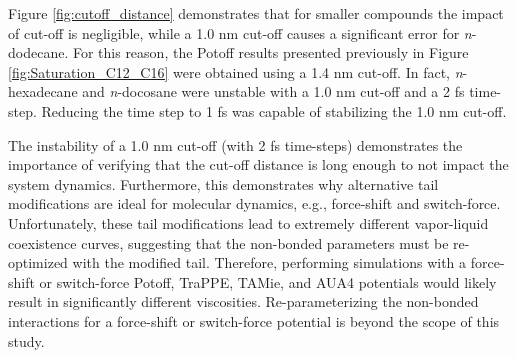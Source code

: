 \documentclass[preprint,review,12pt]{elsarticle}
\begin{document}
	Figure \ref{fig:cutoff_distance} demonstrates that for smaller compounds the impact of cut-off is negligible, while a 1.0 nm cut-off causes a significant error for \textit{n}-dodecane. For this reason, the Potoff results presented previously in Figure \ref{fig:Saturation_C12_C16} were obtained using a 1.4 nm cut-off. In fact, \textit{n}-hexadecane and \textit{n}-docosane were unstable with a 1.0 nm cut-off and a 2 fs time-step. Reducing the time step to 1 fs was capable of stabilizing the 1.0 nm cut-off. 
	
    The instability of a 1.0 nm cut-off (with 2 fs time-steps) demonstrates the importance of verifying that the cut-off distance is long enough to not impact the system dynamics. Furthermore, this demonstrates why alternative tail modifications are ideal for molecular dynamics, e.g., force-shift and switch-force. Unfortunately, these tail modifications lead to extremely different vapor-liquid coexistence curves, suggesting that the non-bonded parameters must be re-optimized with the modified tail. Therefore, performing simulations with a force-shift or switch-force Potoff, TraPPE, TAMie, and AUA4 potentials would likely result in significantly different viscosities. Re-parameterizing the non-bonded interactions for a force-shift or switch-force potential is beyond the scope of this study.
	
	
\end{document}
